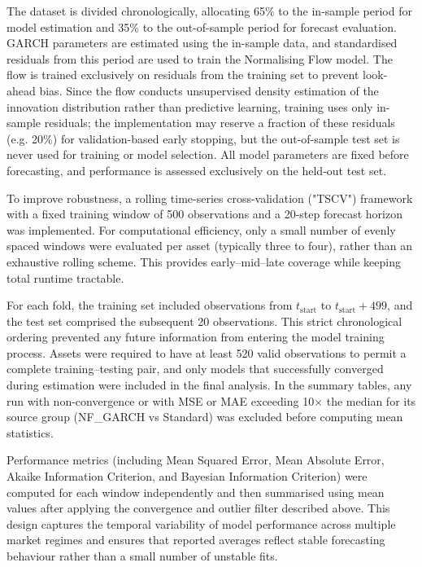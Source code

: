 \documentclass[oneside,12pt]{CUEDthesisPSnPDF}
\begin{document}
\noindent
The dataset is divided chronologically, allocating 65\% to the in-sample period for model estimation and 35\% to the out-of-sample period for forecast evaluation. GARCH parameters are estimated using the in-sample data, and standardised residuals from this period are used to train the Normalising Flow model. The flow is trained exclusively on residuals from the training set to prevent look-ahead bias. Since the flow conducts unsupervised density estimation of the innovation distribution rather than predictive learning, training uses only in-sample residuals; the implementation may reserve a fraction of these residuals (e.g. 20\%) for validation-based early stopping, but the out-of-sample test set is never used for training or model selection. All model parameters are fixed before forecasting, and performance is assessed exclusively on the held-out test set.

\medskip
\noindent
To improve robustness, a rolling time-series cross-validation ("TSCV") framework with a fixed training window of 500 observations and a 20-step forecast horizon was implemented. For computational efficiency, only a small number of evenly spaced windows were evaluated per asset (typically three to four), rather than an exhaustive rolling scheme. This provides early–mid–late coverage while keeping total runtime tractable.

\medskip
\noindent
For each fold, the training set included observations from \(t_{\text{start}}\) to \(t_{\text{start}} + 499\), and the test set comprised the subsequent 20 observations. This strict chronological ordering prevented any future information from entering the model training process. Assets were required to have at least 520 valid observations to permit a complete training–testing pair, and only models that successfully converged during estimation were included in the final analysis. In the summary tables, any run with non-convergence or with MSE or MAE exceeding 10$\times$ the median for its source group (NF\_GARCH vs Standard) was excluded before computing mean statistics.

\medskip
\noindent
Performance metrics (including Mean Squared Error, Mean Absolute Error, Akaike Information Criterion, and Bayesian Information Criterion) were computed for each window independently and then summarised using mean values after applying the convergence and outlier filter described above. This design captures the temporal variability of model performance across multiple market regimes and ensures that reported averages reflect stable forecasting behaviour rather than a small number of unstable fits.\\
\end{document}
